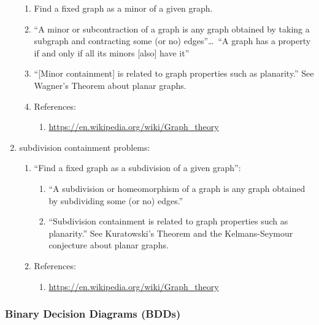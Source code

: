 \begin{enumerate}
	\begin{enumerate} \itemsep -2pt
	\item Find a fixed graph as a minor of a given graph.
	\item ``A minor or subcontraction of a graph is any graph obtained by taking a subgraph and contracting some (or no) edges''\dots\ ``A graph has a property if and only if all its minors [also] have it''
	\item ``[Minor containment] is related to graph properties such as planarity.'' See Wagner's Theorem about planar graphs.
	\item References: \vspace{-0.2cm}
		\begin{enumerate} \itemsep -2pt
		\item \url{https://en.wikipedia.org/wiki/Graph_theory}
		\end{enumerate}
	\end{enumerate}
\item subdivision containment problems: \vspace{-0.3cm}
	\begin{enumerate} \itemsep -2pt
	\item ``Find a fixed graph as a subdivision of a given graph'': \vspace{-0.2cm}
		\begin{enumerate} \itemsep -2pt
		\item ``A subdivision or homeomorphism of a graph is any graph obtained by subdividing some (or no) edges.''
		\item ``Subdivision containment is related to graph properties such as planarity.'' See Kuratowski's Theorem and the Kelmans-Seymour conjecture about planar graphs.
		\end{enumerate}
	\item References: \vspace{-0.2cm}
		\begin{enumerate} \itemsep -2pt
		\item \url{https://en.wikipedia.org/wiki/Graph_theory}
		\end{enumerate}
	\end{enumerate}
\end{enumerate}

\subsubsection{Binary Decision Diagrams (BDDs)}
\label{sssec:BinaryDecisionDiagramsBDDs}





